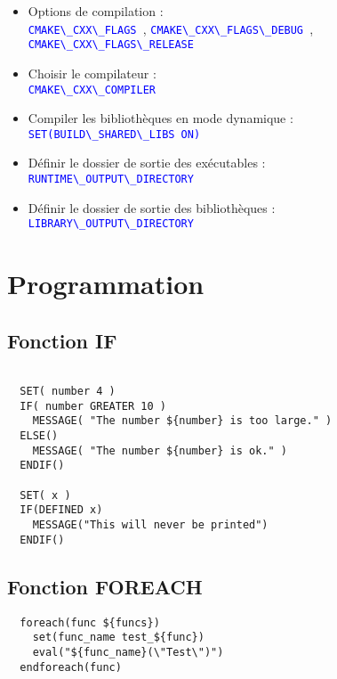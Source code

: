 \documentclass[a4paper,oneside]{article}
\begin{document}
\begin{itemize}
\item Options de compilation :\\
  \textcolor{blue}{\verb?CMAKE\_CXX\_FLAGS ?},
  \textcolor{blue}{\verb?CMAKE\_CXX\_FLAGS\_DEBUG ?},
  \textcolor{blue}{\verb?CMAKE\_CXX\_FLAGS\_RELEASE ?}
\item Choisir le compilateur :\\
  \textcolor{blue}{\verb?CMAKE\_CXX\_COMPILER?}
\item Compiler les bibliothèques en mode dynamique :\\
  \textcolor{blue}{\verb?SET(BUILD\_SHARED\_LIBS ON)?}
\item Définir le dossier de sortie des exécutables :\\
  \textcolor{blue}{\verb?RUNTIME\_OUTPUT\_DIRECTORY?}
\item Définir le dossier de sortie des bibliothèques :\\
  \textcolor{blue}{\verb?LIBRARY\_OUTPUT\_DIRECTORY?}
\end{itemize}

\section{Programmation}
\subsection{Fonction IF}
\begin{verbatim}

  SET( number 4 )
  IF( number GREATER 10 )
    MESSAGE( "The number ${number} is too large." )
  ELSE()
    MESSAGE( "The number ${number} is ok." )
  ENDIF()

  SET( x )
  IF(DEFINED x)
    MESSAGE("This will never be printed")
  ENDIF()
\end{verbatim}

\subsection{Fonction FOREACH}
\begin{verbatim}
  foreach(func ${funcs})
    set(func_name test_${func})
    eval("${func_name}(\"Test\")")
  endforeach(func)
\end{verbatim}
\end{document}
